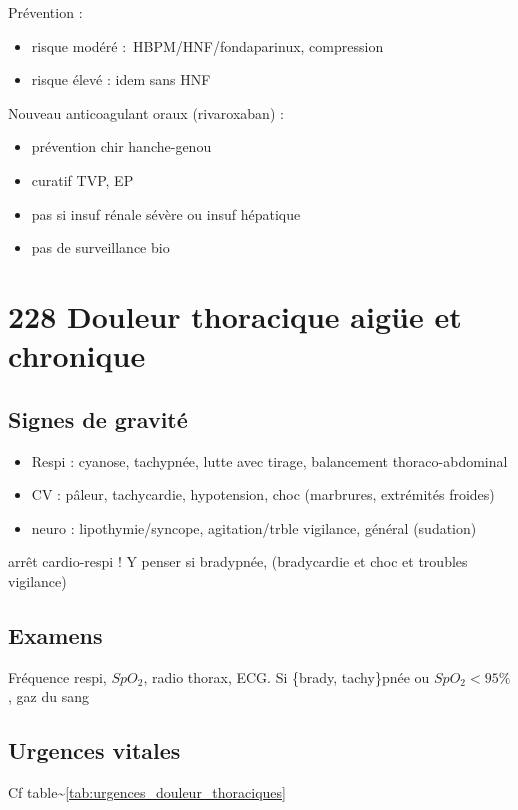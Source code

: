 \documentclass{book}
\begin{document}
Prévention : 

\begin{itemize}
\item risque modéré : HBPM/HNF/fondaparinux, compression
\item risque élevé : idem sans HNF
\end{itemize}


Nouveau anticoagulant oraux (rivaroxaban) :

\begin{itemize}
\item prévention chir hanche-genou
\item curatif TVP, EP
\item pas si insuf rénale sévère ou insuf hépatique
\item pas de surveillance bio
\end{itemize}

\section{228 \textdagger{} Douleur thoracique aigüe et chronique}
\label{sec:org1e698ca}
\label{sec:228_douleur_thoracique_aigue_et_chronique}

\subsection{Signes de gravité}
\label{sec:orgd8fd6fa}

\begin{itemize}
\item Respi : cyanose, tachypnée, lutte avec tirage, balancement thoraco-abdominal
\item CV : pâleur, tachycardie, hypotension, choc (marbrures, extrémités
froides)
\item neuro : lipothymie/syncope, agitation/trble vigilance, général (sudation)
\end{itemize}


\danger arrêt cardio-respi ! Y penser si bradypnée, (bradycardie et choc et troubles vigilance)

\subsection{Examens}
\label{sec:org0f8b221}
Fréquence respi, \(SpO_2\), radio thorax, ECG.
Si \{brady, tachy\}pnée ou \(SpO_2 < 95\%\), gaz du sang

\subsection{Urgences vitales}
\label{sec:orgda35056}
Cf table\textasciitilde{}\ref{tab:urgences_douleur_thoraciques}
\end{document}
